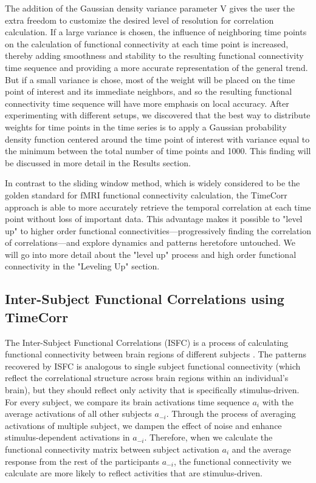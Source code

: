 \documentclass[12pt]{article}
\begin{document}
The addition of the Gaussian density variance parameter V gives the user the extra freedom to customize the desired level of resolution for correlation calculation. If a large variance is chosen, the influence of neighboring time points on the calculation of functional connectivity at each time point is increased, thereby adding smoothness and stability to the resulting functional connectivity time sequence and providing a more accurate representation of the general trend. But if a small variance is chose, most of the weight will be placed on the time point of interest and its immediate neighbors, and so the resulting functional connectivity time sequence will have more emphasis on local accuracy. After experimenting with different setups, we discovered that the best way to distribute weights for time points in the time series is to apply a Gaussian probability density function centered around the time point of interest with variance equal to the minimum between the total number of time points and 1000. This finding will be discussed in more detail in the Results section.

In contrast to the sliding window method, which is widely considered to be the golden standard for fMRI functional connectivity calculation, the TimeCorr approach is able to more accurately retrieve the temporal correlation at each time point without loss of important data. This advantage makes it possible to "level up" to higher order functional connectivities---progressively finding the correlation of correlations---and explore dynamics and patterns heretofore untouched. We will go into more detail about the "level up" process and high order functional connectivity in the "Leveling Up" section.

\subsection{Inter-Subject Functional Correlations using TimeCorr}

The Inter-Subject Functional Correlations (ISFC) is a process of calculating functional connectivity between brain regions of different subjects \cite{jeremy2017}\cite{hasson2016}. The patterns recovered by ISFC is analogous to single subject functional connectivity (which reflect the correlational structure across brain regions within an individual's
brain), but they should reflect only activity that is specifically stimulus-driven. For every subject, we compare its brain activations time sequence $a_i$ with the average activations of all other subjects $a_{-i}$. Through the process of averaging activations of multiple subject, we dampen the effect of noise and enhance stimulus-dependent activations in $a_{-i}$. Therefore, when we calculate the functional connectivity matrix between subject activation $a_i$ and the average response from the rest of the participants $a_{-i}$, the functional connectivity we calculate are more likely to reflect activities that are stimulus-driven.
\end{document}
